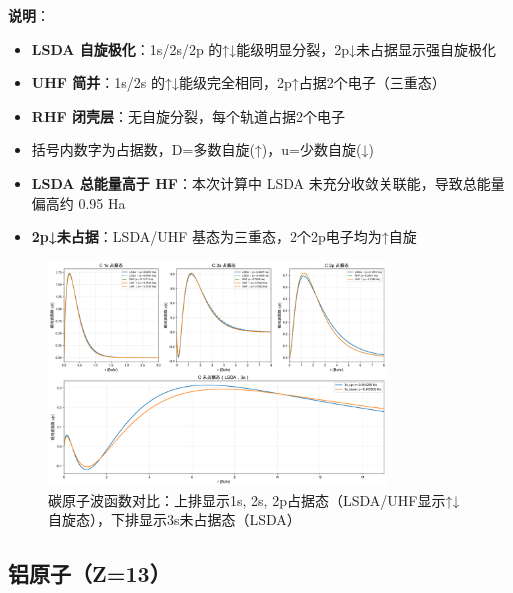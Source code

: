 \documentclass[12pt,a4paper]{article}
\begin{document}
\textbf{说明}：
\begin{itemize}
    \item \textbf{LSDA 自旋极化}：1s/2s/2p 的↑↓能级明显分裂，2p↓未占据显示强自旋极化
    \item \textbf{UHF 简并}：1s/2s 的↑↓能级完全相同，2p↑占据2个电子（三重态）
    \item \textbf{RHF 闭壳层}：无自旋分裂，每个轨道占据2个电子
    \item 括号内数字为占据数，D=多数自旋(↑)，u=少数自旋(↓)
    \item \textbf{LSDA 总能量高于 HF}：本次计算中 LSDA 未充分收敛关联能，导致总能量偏高约 0.95 Ha
    \item \textbf{2p↓未占据}：LSDA/UHF 基态为三重态，2个2p电子均为↑自旋
\end{itemize}

\begin{figure}[H]
    \centering
    \includegraphics[width=0.8\textwidth]{figures/C_comparison.png}
    \caption{碳原子波函数对比：上排显示1s, 2s, 2p占据态（LSDA/UHF显示↑↓自旋态），下排显示3s未占据态（LSDA）}
\end{figure}

\subsection{铝原子（Z=13）}
\end{document}
